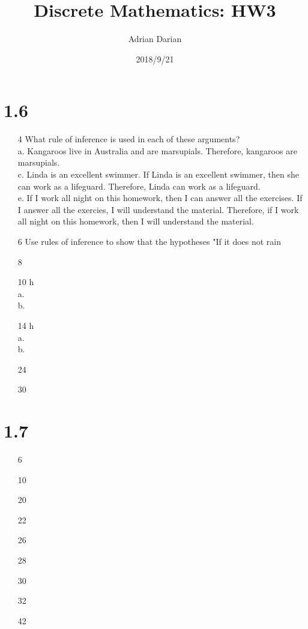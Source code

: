 \documentclass[a4paper]{article}
\title{Discrete Mathematics: HW3}
\author{Adrian Darian}
\date{2018/9/21}
\begin{document}
  
  \maketitle
  
  \section*{1.6}
  \begin{itemize}
    \item[4] What rule of inference is used in each of these arguments? \\
      a. Kangaroos live in Australia and are marsupials. Therefore, kangaroos are marsupials. \\
      c. Linda is an excellent swimmer. If Linda is an excellent swimmer, then she can work as a lifeguard. Therefore, Linda can work as a lifeguard. \\
      e. If I work all night on this homework, then I can answer all the exercises. If I answer all the exercies, I will understand the material. Therefore, if I work all night on this homework, then I will understand the material.
    \item[6] Use rules of inference to show that the hypotheses "If it does not rain 
    \item[8]
    \item[10] h \\
      a. \\
      b.
    \item[14] h \\
      a. \\
      b. 
    \item[24]
    \item[30]
  \end{itemize}
  
  \section*{1.7}
  \begin{itemize}
    \item[6]
    \item[10]
    \item[20]
    \item[22]
    \item[26]
    \item[28]
    \item[30]
    \item[32]
    \item[42]
  \end{itemize}
 

  
  
\end{document}
